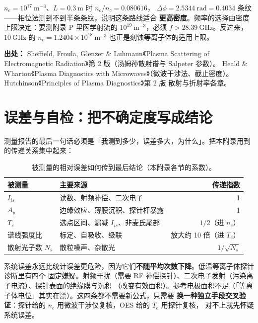 $n_e=10^{17}\ \mathrm{m^{-3}}$、$L=0.3\ \mathrm{m}$ 时 $n_e/n_c=0.080616$，
$\Delta\phi=2.5344\ \mathrm{rad}=0.4034$ 条纹——相位法测到不到半条条纹，说明这条路线适合
\textbf{更高密度}。频率的选择由密度上限决定：要测附录 P 里医学射流的
$10^{19}\ \mathrm{m^{-3}}$，必须 $f>28.39\ \mathrm{GHz}$。反过来，$10\ \mathrm{GHz}$ 的
$n_c=1.2404\times10^{18}\ \mathrm{m^{-3}}$ 也正是刻蚀等离子体的适用上限。

{\footnotesize
\textbf{出处：} Sheffield, Froula, Glenzer \& Luhmann《Plasma Scattering of Electromagnetic
Radiation》第 2 版（汤姆孙散射谱与 Salpeter 参数）。
Heald \& Wharton《Plasma Diagnostics with
Microwaves》（微波干涉法、截止密度）。
Hutchinson《Principles of Plasma Diagnostics》第 2 版
散射与折射率各章。
}

\section{误差与自检：把不确定度写成结论}
\label{sec:app-q-error}

测量报告的最后一句话必须是「我测到多少，误差多大，为什么」。把本附录用到的传递关系集中起来：

\begin{table}[htbp]
  \centering
  \caption{被测量的相对误差如何传到最后结论（本附录各节的系数）。}
  \label{tab:app-q-error}
  \begin{tabular}{@{}p{3.4cm}p{7.0cm}r@{}}
    \toprule
    被测量 & 主要来源 & 传递指数 \\
    \midrule
    $I_{is}$ & 读数、射频补偿、二次电子 & 1 \\
    $A_p$ & 边缘效应、薄膜沉积、探针杆暴露 & 1 \\
    $T_e$ & 选点区间、漏减 $I_{is}$、非麦氏尾部 & $1/2$（进 $n_e$） \\
    谱线强度比 & 标定、自吸收、级联 & 放大约 10 倍（进 $T_e$） \\
    散射光子数 $N_s$ & 散粒噪声、杂散光 & $1/\sqrt{N_s}$ \\
    \bottomrule
  \end{tabular}
\end{table}

系统误差永远比统计误差更危险，因为它们\textbf{不随平均次数下降}。低温等离子体探针诊断里有四个
固定嫌疑。射频干扰（需要 RF 补偿探针）、二次电子发射（污染离子电流）、探针表面的绝缘膜与沉积
（改变有效面积）。参考电极面积不足（「等离子体电位」其实在漂）。这四条都不需要新公式，只需要
\textbf{换一种独立手段交叉验证}：探针给的 $n_e$ 用微波干涉仪复核，OES 给的 $T_e$ 用探针复核，
对不上就先怀疑系统误差。


